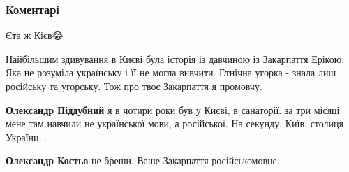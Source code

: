  
 
 
 
 
\subsubsection{Коментарі}

\begin{itemize}
 
Єта ж Кієв😂

\begin{itemize}
 

Найбільшим здивування в Києві була історія із давчиною із Закарпаття Ерікою.
Яка не розуміла українську і її не могла вивчити. Етнічна угорка - знала лиш
російську та угорську. Тож про твоє Закарпаття я промовчу.


 
\textbf{Олександр Піддубний} я в чотири роки був у Києві, в санаторії. за три
місяці мене там навчили не української мови, а російської. На секунду, Київ,
столиця України...

 
\textbf{Олександр Костьо} не бреши. Ваше Закарпаття російськомовне.


\end{itemize}
\end{itemize}
